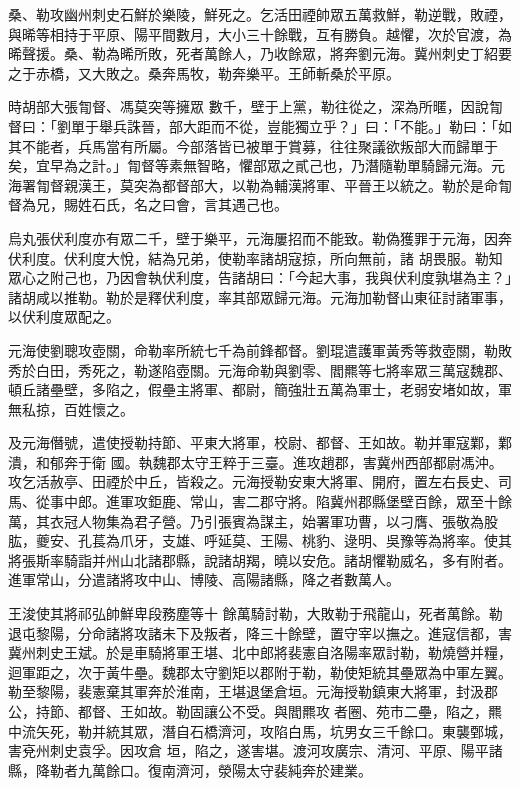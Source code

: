 \begin{pinyinscope}
 桑、勒攻幽州刺史石鮮於樂陵，鮮死之。乞活田禋帥眾五萬救鮮，勒逆戰，敗禋，與晞等相持于平原、陽平間數月，大小三十餘戰，互有勝負。越懼，次於官渡，為晞聲援。桑、勒為晞所敗，死者萬餘人，乃收餘眾，將奔劉元海。冀州刺史丁紹要之于赤橋，又大敗之。桑奔馬牧，勒奔樂平。王師斬桑於平原。



 時胡部大張㔨督、馮莫突等擁眾
 數千，壁于上黨，勒往從之，深為所暱，因說㔨督曰：「劉單于舉兵誅晉，部大距而不從，豈能獨立乎？」曰：「不能。」勒曰：「如其不能者，兵馬當有所屬。今部落皆已被單于賞募，往往聚議欲叛部大而歸單于矣，宜早為之計。」㔨督等素無智略，懼部眾之貳己也，乃潛隨勒單騎歸元海。元海署㔨督親漢王，莫突為都督部大，以勒為輔漢將軍、平晉王以統之。勒於是命㔨督為兄，賜姓石氏，名之曰會，言其遇己也。



 烏丸張伏利度亦有眾二千，壁于樂平，元海屢招而不能致。勒偽獲罪于元海，因奔伏利度。伏利度大悅，結為兄弟，使勒率諸胡寇掠，所向無前，諸
 胡畏服。勒知眾心之附己也，乃因會執伏利度，告諸胡曰：「今起大事，我與伏利度孰堪為主？」諸胡咸以推勒。勒於是釋伏利度，率其部眾歸元海。元海加勒督山東征討諸軍事，以伏利度眾配之。



 元海使劉聰攻壺關，命勒率所統七千為前鋒都督。劉琨遣護軍黃秀等救壺關，勒敗秀於白田，秀死之，勒遂陷壺關。元海命勒與劉零、閻羆等七將率眾三萬寇魏郡、頓丘諸壘壁，多陷之，假壘主將軍、都尉，簡強壯五萬為軍士，老弱安堵如故，軍無私掠，百姓懷之。



 及元海僭號，遣使授勒持節、平東大將軍，校尉、都督、王如故。勒并軍寇鄴，鄴潰，和郁奔于衛
 國。執魏郡太守王粹于三臺。進攻趙郡，害冀州西部都尉馮沖。攻乞活赦亭、田禋於中丘，皆殺之。元海授勒安東大將軍、開府，置左右長史、司馬、從事中郎。進軍攻鉅鹿、常山，害二郡守將。陷冀州郡縣堡壁百餘，眾至十餘萬，其衣冠人物集為君子營。乃引張賓為謀主，始署軍功曹，以刁膺、張敬為股肱，夔安、孔萇為爪牙，支雄、呼延莫、王陽、桃豹、逯明、吳豫等為將率。使其將張斯率騎詣并州山北諸郡縣，說諸胡羯，曉以安危。諸胡懼勒威名，多有附者。進軍常山，分遣諸將攻中山、博陵、高陽諸縣，降之者數萬人。



 王浚使其將祁弘帥鮮卑段務塵等十
 餘萬騎討勒，大敗勒于飛龍山，死者萬餘。勒退屯黎陽，分命諸將攻諸未下及叛者，降三十餘壁，置守宰以撫之。進寇信都，害冀州刺史王斌。於是車騎將軍王堪、北中郎將裴憲自洛陽率眾討勒，勒燒營并糧，迴軍距之，次于黃牛壘。魏郡太守劉矩以郡附于勒，勒使矩統其壘眾為中軍左翼。勒至黎陽，裴憲棄其軍奔於淮南，王堪退堡倉垣。元海授勒鎮東大將軍，封汲郡公，持節、都督、王如故。勒固讓公不受。與閻羆攻者圈、苑市二壘，陷之，羆中流矢死，勒并統其眾，潛自石橋濟河，攻陷白馬，坑男女三千餘口。東襲鄄城，害兗州刺史袁孚。因攻倉
 垣，陷之，遂害堪。渡河攻廣宗、清河、平原、陽平諸縣，降勒者九萬餘口。復南濟河，滎陽太守裴純奔於建業。




\end{pinyinscope}
